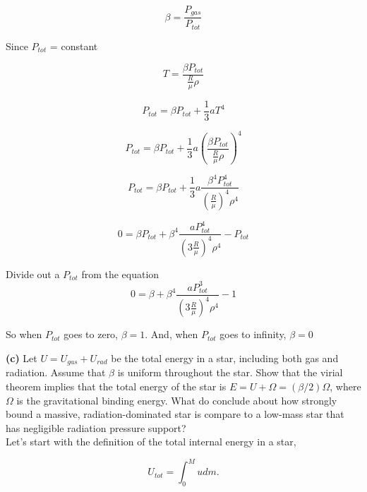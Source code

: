 \documentclass[12pt]{article}
\begin{document}
\begin{equation}
\beta = \frac{P_{gas}}{P_{tot}}
\end{equation} 

\noindent Since $P_{tot}$ = constant 

\begin{equation}
T = \frac{\beta P_{tot}}{\frac{R}{\mu}\rho}
\end{equation}

\begin{equation}
P_{tot} = \beta P_{tot} + \frac{1}{3}aT^4
\end{equation}

\begin{equation}
P_{tot} = \beta P_{tot} + \frac{1}{3}a\left (\frac{\beta P_{tot}}{\frac{R}{\mu}\rho}  \right) ^4
\end{equation}


\begin{equation}
P_{tot} = \beta P_{tot} + \frac{1}{3}a \frac{\beta^4 P_{tot}^4}{\left(\frac{R}{\mu}\right)^4 \rho^4}  
\end{equation}

\begin{equation}
0 = \beta P_{tot} + \beta^4 \frac{aP_{tot}^4}{\left(3\frac{R}{\mu}\right)^4 \rho^4}  - P_{tot}
\end{equation}

\noindent Divide out a $P_{tot}$ from the equation 
\begin{equation}
0 = \beta + \beta^4 \frac{aP_{tot}^3}{\left(3\frac{R}{\mu}\right)^4 \rho^4}  - 1
\end{equation}


\noindent So when $P_{tot}$ goes to zero, $\beta = 1$. And, when $P_{tot}$ goes to infinity, $\beta = 0$ 

\noindent \textbf{(c)} Let $U = U_{gas} + U_{rad}$ be the total energy in a star, including both gas and radiation. Assume that $\beta$ is uniform throughout the star. Show that the virial theorem implies that the total energy of the star is $E = U + \Omega = \left( \beta/2\right)\Omega$, where $\Omega$ is the gravitational binding energy. What do conclude about how strongly bound a massive, radiation-dominated star is compare to a low-mass star that has negligible radiation pressure support?\\

\noindent Let's start with the definition of the total internal energy in a star,

\begin{equation}
U_{tot} = \int_0^M u dm.
\end{equation}
\end{document}
